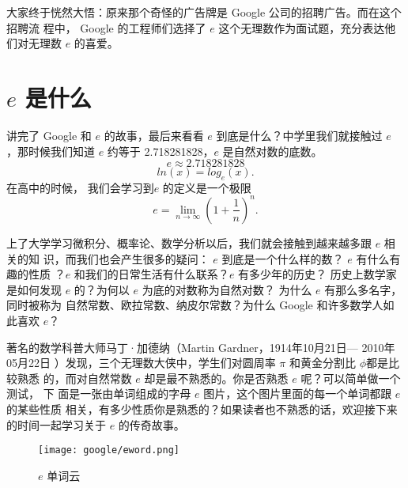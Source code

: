 大家终于恍然大悟：原来那个奇怪的广告牌是 Google 公司的招聘广告。而在这个招聘流
程中， Google 的工程师们选择了 $e$ 这个无理数作为面试题，充分表达他们对无理数
$e$ 的喜爱。

\section{$e$ 是什么}
讲完了 Google 和 $e$ 的故事，最后来看看 $e$ 到底是什么？中学里我们就接触过 $e$
，那时候我们知道 $e$ 约等于 2.718281828，$e$ 是自然对数的底数。
$$ e \approx 2.718281828 $$
$$ ln(x) = log_{e}(x) . $$
在高中的时候， 我们会学习到$e$ 的定义是一个极限
$$ e = \lim_{n \to \infty}(1+\frac{1}{n})^n  .$$

上了大学学习微积分、概率论、数学分析以后，我们就会接触到越来越多跟 $e$ 相关的知
识，而我们也会产生很多的疑问： $e$ 到底是一个什么样的数？ $e$ 有什么有趣的性质
？$e$ 和我们的日常生活有什么联系？$e$ 有多少年的历史？ 历史上数学家是如何发现
$e$ 的？为何以 $e$ 为底的对数称为自然对数？ 为什么 $e$ 有那么多名字，同时被称为
自然常数、欧拉常数、纳皮尔常数？为什么 Google 和许多数学人如此喜欢 $e$？

著名的数学科普大师马丁·加德纳（Martin Gardner，1914年10月21日— 2010年05月22日
）发现，三个无理数大侠中，学生们对圆周率 $\pi$ 和黄金分割比 $\phi$都是比较熟悉
的，而对自然常数 $e$ 却是最不熟悉的。你是否熟悉 $e$ 呢？可以简单做一个测试， 下
面是一张由单词组成的字母 $e$ 图片，这个图片里面的每一个单词都跟 $e$ 的某些性质
相关，有多少性质你是熟悉的？如果读者也不熟悉的话，欢迎接下来的时间一起学习关于
$e$ 的传奇故事。
\begin{figure}[htbp]
\centering
\texttt{[image: google/eword.png]}
\caption{$e$ 单词云}
\centering
\end{figure}


